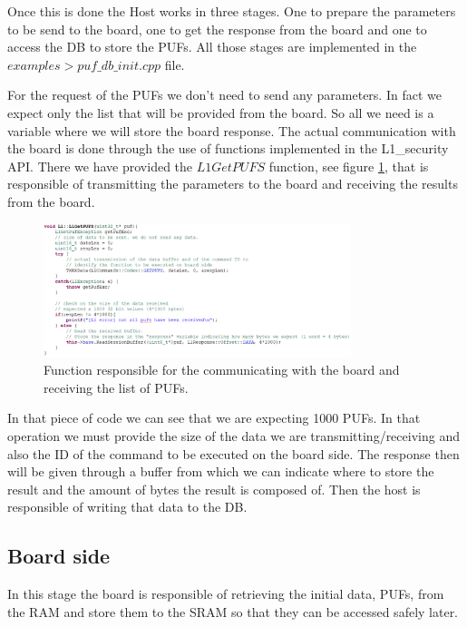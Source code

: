 Once this is done the Host works in three stages. One to prepare the parameters to be send to the board, one to get the response from the board and one to access the DB to store the PUFs. All those stages are implemented in the $examples > puf\_db\_init.cpp$ file.

For the request of the PUFs we don't need to send any parameters. In fact we expect only the list that will be provided from the board. So all we need is a variable where we will store the board response.
The actual communication with the board is done through the use of functions implemented in the L1\_security API. There we have provided the $L1GetPUFS$ function, see figure \ref{fig:L1GetPUFS}, that is responsible of transmitting the parameters to the board and receiving the results from the board.


\begin{figure}[h!]
	\vspace{0.5cm}
	\includegraphics[width = 0.8\textwidth]{images/L1GetPUFS.png}
	\caption{Function responsible for the communicating with the board and receiving the list of PUFs. }
	\label{fig:L1GetPUFS}
\end{figure}

In that piece of code we can see that we are expecting 1000 PUFs. In that operation we must provide the size of the data we are transmitting/receiving and also the ID of the command to be executed on the board side. The response then will be given through a buffer from which we can indicate where to store the result and the amount of bytes the result is composed of. Then the host is responsible of writing that data to the DB.

\subsection{Board side}

In this stage the board is responsible of retrieving the initial data, PUFs, from the RAM and store them to the SRAM so that they can be accessed safely later.


